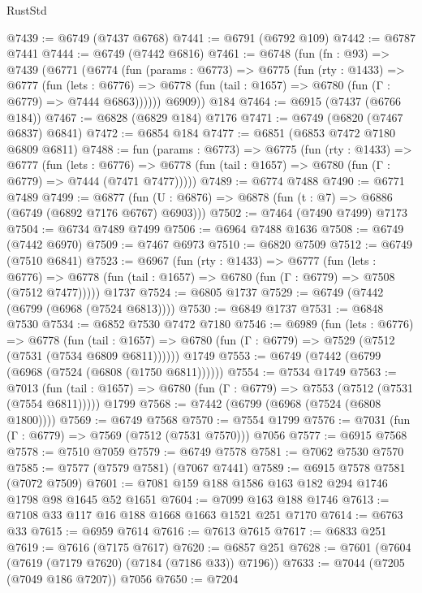 \begin{lexlean}{RustStd}
\begin{coremodule}
@7439 := @6749 (@7437 @6768)
@7441 := @6791 (@6792 @109)
@7442 := @6787 @7441
@7444 := @6749 (@7442 @6816)
@7461 := @6748
    (fun (fn : @93) =>
    @7439
      (@6771
        (@6774
          (fun (params : @6773) =>
          @6775
            (fun (rty : @1433) =>
            @6777
              (fun (lets : @6776) =>
              @6778 (fun (tail : @1657) => @6780 (fun (Γ : @6779) => @7444 @6863))))))
        @6909))
    @184
@7464 := @6915 (@7437 (@6766 @184))
@7467 := @6828 (@6829 @184) @7176
@7471 := @6749 (@6820 (@7467 @6837) @6841)
@7472 := @6854 @184
@7477 := @6851 (@6853 @7472 @7180 @6809 @6811)
@7488 := fun (params : @6773) =>
  @6775
    (fun (rty : @1433) =>
    @6777
      (fun (lets : @6776) =>
      @6778 (fun (tail : @1657) => @6780 (fun (Γ : @6779) => @7444 (@7471 @7477)))))
@7489 := @6774 @7488
@7490 := @6771 @7489
@7499 := @6877 (fun (U : @6876) => @6878 (fun (t : @7) => @6886 (@6749 (@6892 @7176 @6767) @6903)))
@7502 := @7464 (@7490 @7499) @7173
@7504 := @6734 @7489 @7499
@7506 := @6964 @7488 @1636
@7508 := @6749 (@7442 @6970)
@7509 := @7467 @6973
@7510 := @6820 @7509
@7512 := @6749 (@7510 @6841)
@7523 := @6967
    (fun (rty : @1433) =>
    @6777
      (fun (lets : @6776) =>
      @6778 (fun (tail : @1657) => @6780 (fun (Γ : @6779) => @7508 (@7512 @7477)))))
    @1737
@7524 := @6805 @1737
@7529 := @6749 (@7442 (@6799 (@6968 (@7524 @6813))))
@7530 := @6849 @1737
@7531 := @6848 @7530
@7534 := @6852 @7530 @7472 @7180
@7546 := @6989
    (fun (lets : @6776) =>
    @6778
      (fun (tail : @1657) => @6780 (fun (Γ : @6779) => @7529 (@7512 (@7531 (@7534 @6809 @6811))))))
    @1749
@7553 := @6749 (@7442 (@6799 (@6968 (@7524 (@6808 (@1750 @6811))))))
@7554 := @7534 @1749
@7563 := @7013
    (fun (tail : @1657) => @6780 (fun (Γ : @6779) => @7553 (@7512 (@7531 (@7554 @6811)))))
    @1799
@7568 := @7442 (@6799 (@6968 (@7524 (@6808 @1800))))
@7569 := @6749 @7568
@7570 := @7554 @1799
@7576 := @7031 (fun (Γ : @6779) => @7569 (@7512 (@7531 @7570))) @7056
@7577 := @6915 @7568
@7578 := @7510 @7059
@7579 := @6749 @7578
@7581 := @7062 @7530 @7570
@7585 := @7577 (@7579 @7581) (@7067 @7441)
@7589 := @6915 @7578 @7581 (@7072 @7509)
@7601 := @7081 @159 @188 @1586 @163 @182 @294 @1746 @1798 @98 @1645 @52 @1651
@7604 := @7099 @163 @188 @1746
@7613 := @7108 @33 @117 @16 @188 @1668 @1663 @1521 @251 @7170
@7614 := @6763 @33
@7615 := @6959 @7614
@7616 := @7613 @7615
@7617 := @6833 @251
@7619 := @7616 (@7175 @7617)
@7620 := @6857 @251
@7628 := @7601 (@7604 (@7619 (@7179 @7620) (@7184 (@7186 @33)) @7196))
@7633 := @7044 (@7205 (@7049 @186 @7207)) @7056
@7650 := @7204

\end{coremodule}
\end{lexlean}
